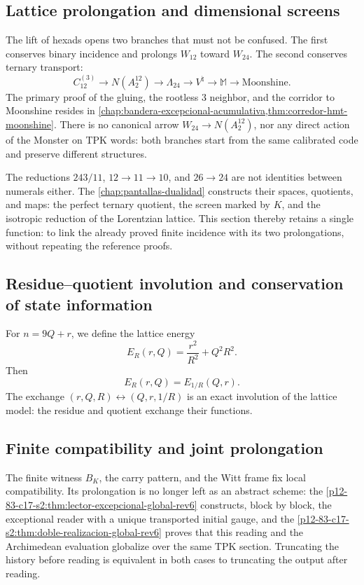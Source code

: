 \subsection{Lattice prolongation and dimensional screens}

The lift of hexads opens two branches that must not be confused. The first
conserves binary incidence and prolongs \(W_{12}\) toward \(W_{24}\). The
second conserves ternary transport:
\[
C_{12}^{(3)}
\longrightarrow N(A_2^{12})
\longrightarrow\Lambda_{24}
\longrightarrow V^\natural
\longrightarrow\mathbb M
\longrightarrow\text{Moonshine}.
\]
The primary proof of the gluing, the rootless \(3\) neighbor, and the corridor
to Moonshine resides in
\cref{chap:bandera-excepcional-acumulativa,thm:corredor-hmt-moonshine}.
There is no canonical arrow \(W_{24}\to N(A_2^{12})\), nor any direct
action of the Monster on TPK words: both branches start from the same
calibrated code and preserve different structures.

The reductions \(243/11\), \(12\to11\to10\), and \(26\to24\) are not
identities between numerals either. The \cref{chap:pantallas-dualidad} constructs their
spaces, quotients, and maps: the perfect ternary quotient, the screen
marked by \(K\), and the isotropic reduction of the Lorentzian lattice. This
section thereby retains a single function: to link the already proved finite
incidence with its two prolongations, without repeating the reference proofs.

\subsection{Residue–quotient involution and conservation of state information}

For \(n=9Q+r\), we define the lattice energy
\[
E_R(r,Q)=\frac{r^2}{R^2}+Q^2R^2.
\]
Then
\[
\boxed{E_R(r,Q)=E_{1/R}(Q,r).}
\]
The exchange \((r,Q,R)\leftrightarrow(Q,r,1/R)\) is an exact involution
of the lattice model: the residue and quotient exchange their functions.

\subsection{Finite compatibility and joint prolongation}

The finite witness \(B_K\), the carry pattern, and the Witt frame fix
local compatibility. Its prolongation is no longer left as an abstract
scheme: the \cref{p12-83-c17-s2:thm:lector-excepcional-global-rev6} constructs, block by
block, the exceptional reader with a unique transported initial gauge, and the
\cref{p12-83-c17-s2:thm:doble-realizacion-global-rev6} proves that this reading and the
Archimedean evaluation globalize over the same TPK section. Truncating the
history before reading is equivalent in both cases to truncating the output after
reading.

